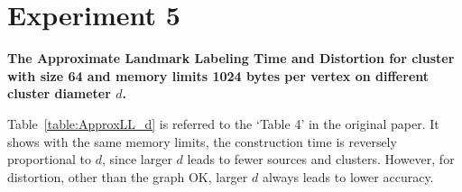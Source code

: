 \documentclass{article}
\begin{document}
\section{Experiment 5}

\begin{table}[htbp]
  \centering
  \footnotesize
  
  \caption{
    \small\textbf{The Approximate Landmark Labeling Time and Distortion for cluster with size 64 and memory limits 1024 bytes per vertex on different cluster diameter $d$.} 
    \label{table:ApproxLL_d}
  }
\end{table}

Table~\ref{table:ApproxLL_d} is referred to the `Table 4' in the original paper. It shows with the same memory limits, the construction time is reversely proportional to $d$, since larger $d$ leads to fewer sources and clusters. However, for distortion, other than the graph OK, larger $d$ always leads to lower accuracy.  
\end{document}
